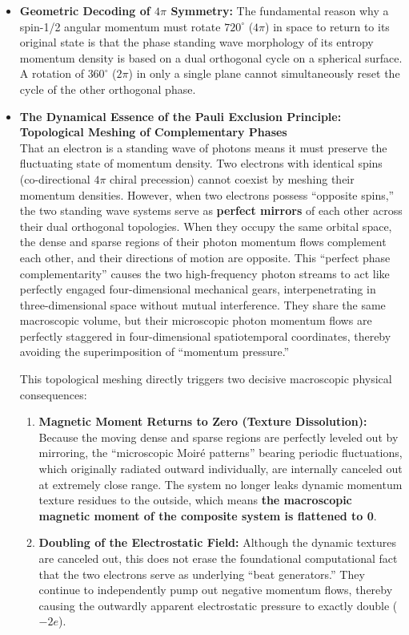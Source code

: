 \documentclass[12pt, a4paper]{article}
\begin{document}
\begin{itemize}
    \item \textbf{Geometric Decoding of $4\pi$ Symmetry:} The fundamental reason why a spin-1/2 angular momentum must rotate $720^\circ$ ($4\pi$) in space to return to its original state is that the phase standing wave morphology of its entropy momentum density is based on a dual orthogonal cycle on a spherical surface. A rotation of $360^\circ$ ($2\pi$) in only a single plane cannot simultaneously reset the cycle of the other orthogonal phase.
    \item \textbf{The Dynamical Essence of the Pauli Exclusion Principle: Topological Meshing of Complementary Phases} \\
    That an electron is a standing wave of photons means it must preserve the fluctuating state of momentum density. Two electrons with identical spins (co-directional $4\pi$ chiral precession) cannot coexist by meshing their momentum densities. However, when two electrons possess ``opposite spins,'' the two standing wave systems serve as \textbf{perfect mirrors} of each other across their dual orthogonal topologies. When they occupy the same orbital space, the dense and sparse regions of their photon momentum flows complement each other, and their directions of motion are opposite. This ``perfect phase complementarity'' causes the two high-frequency photon streams to act like perfectly engaged four-dimensional mechanical gears, interpenetrating in three-dimensional space without mutual interference. They share the same macroscopic volume, but their microscopic photon momentum flows are perfectly staggered in four-dimensional spatiotemporal coordinates, thereby avoiding the superimposition of ``momentum pressure.''
    
    This topological meshing directly triggers two decisive macroscopic physical consequences:
    \begin{enumerate}
        \item \textbf{Magnetic Moment Returns to Zero (Texture Dissolution):} Because the moving dense and sparse regions are perfectly leveled out by mirroring, the ``microscopic Moiré patterns'' bearing periodic fluctuations, which originally radiated outward individually, are internally canceled out at extremely close range. The system no longer leaks dynamic momentum texture residues to the outside, which means \textbf{the macroscopic magnetic moment of the composite system is flattened to 0}.
        \item \textbf{Doubling of the Electrostatic Field:} Although the dynamic textures are canceled out, this does not erase the foundational computational fact that the two electrons serve as underlying ``beat generators.'' They continue to independently pump out negative momentum flows, thereby causing the outwardly apparent electrostatic pressure to exactly double ($-2e$).
    \end{enumerate}
\end{itemize}
\end{document}
